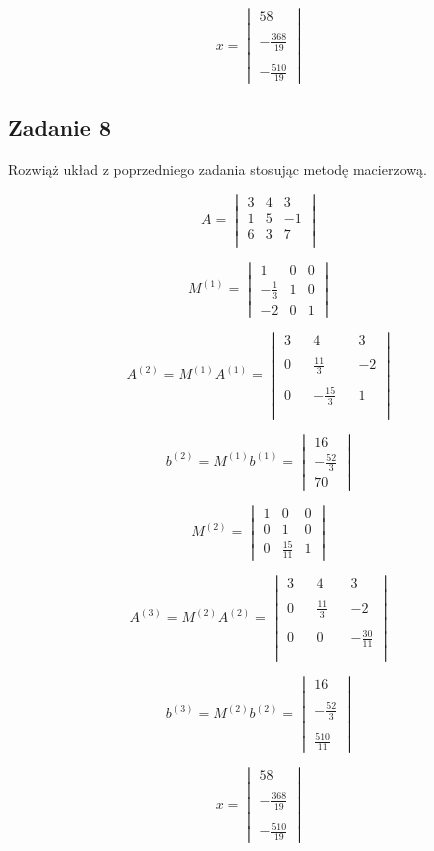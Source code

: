 \documentclass[a4paper]{article}
\begin{document}
$$x=\begin{vmatrix}
58\\ \\
-\frac{368}{19}\\ \\
-\frac{510}{19}
\end{vmatrix}$$

\clearpage
\subsection*{Zadanie 8}
Rozwiąż układ z poprzedniego zadania stosując metodę macierzową.

$$A=\begin{vmatrix}
3 & 4 & 3\\
1 & 5 & -1\\
6 & 3 & 7\\
\end{vmatrix}$$

$$M^{(1)}=\begin{vmatrix}
1 & 0 & 0 \\
-\frac{1}{3}  & 1 & 0 \\
-2 & 0 & 1
\end{vmatrix}$$

$$A^{(2)}=M^{(1)}A^{(1)}=
\begin{vmatrix}
3 && 4 && 3\\ \\
0 && \frac{11}{3} && -2\\ \\
0 && -\frac{15}{3} && 1\\ \\
\end{vmatrix}$$

$$b^{(2)}=M^{(1)}b^{(1)}=\begin{vmatrix}
16\\
-\frac{52}{3}\\
70
\end{vmatrix}$$

$$M^{(2)}=\begin{vmatrix}
1 & 0 & 0 \\
0  & 1 & 0 \\
0 & \frac{15}{11} & 1
\end{vmatrix}$$

$$A^{(3)}=M^{(2)}A^{(2)}=
\begin{vmatrix}
3 && 4 && 3\\ \\
0 && \frac{11}{3} && -2\\ \\
0 && 0 && -\frac{30}{11}\\ \\
\end{vmatrix}$$

$$b^{(3)}=M^{(2)}b^{(2)}=\begin{vmatrix}
16\\ \\
-\frac{52}{3}\\ \\
\frac{510}{11}
\end{vmatrix}$$

$$x=\begin{vmatrix}
58\\ \\
-\frac{368}{19}\\ \\
-\frac{510}{19}
\end{vmatrix}$$
\end{document}
